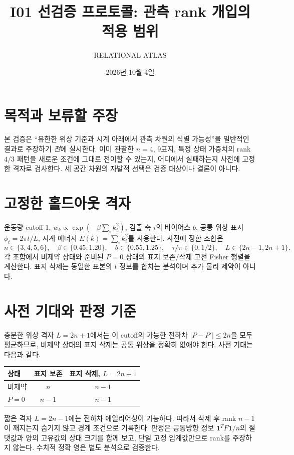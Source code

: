 \documentclass[11pt,a4paper]{article}
\title{I01 선검증 프로토콜: 관측 rank 개입의 적용 범위}
\author{RELATIONAL ATLAS}
\date{2026년 10월 4일}
\begin{document}
\maketitle

\section{목적과 보류할 주장}
본 검증은 ``유한한 위상 기준과 시계 아래에서 관측 차원의 식별
가능성''을 일반적인 결과로 주장하기 \emph{전}에 실시한다.
이미 관찰한 $n=4$, 9표지, 특정 상태 가중치의 rank $4/3$
패턴을 새로운 조건에 그대로 전이할 수 있는지, 어디에서 실패하는지
사전에 고정한 격자로 검사한다. 세 공간 차원의 자발적 선택은
검증 대상이나 결론이 아니다.

\section{고정한 홀드아웃 격자}
운동량 cutoff 1, $w_k\propto\exp(-\beta\sum_i k_i^2)$,
검출 축 $i$의 바이어스 $b$, 공통 위상 표지
$\phi_t=2\pi t/L$, 시계 에너지 $E(k)=\sum_i k_i^2$를 사용한다.
사전에 정한 조합은
\begin{equation}
 n\in\{3,4,5,6\},\quad
 \beta\in\{0.45,1.20\},\quad
 b\in\{0.55,1.25\},\quad
 \tau/\pi\in\{0,1/2\},\quad
 L\in\{2n-1,2n+1\}.
\end{equation}
각 조합에서 비제약 상태와 준비된 $P=0$ 상태의 표지 보존/삭제
고전 Fisher 행렬을 계산한다. 표지 삭제는 동일한 표본의
$t$ 정보를 합치는 분석이며 추가 물리 제약이 아니다.

\section{사전 기대와 판정 기준}
충분한 위상 격자 $L=2n+1$에서는 이 cutoff의 가능한 전하차
$|P-P'|\le2n$을 모두 평균하므로, 비제약 상태의 표지 삭제는
공통 위상을 정확히 없애야 한다. 사전 기대는 다음과 같다.
\begin{center}
\begin{tabular}{@{}lcc@{}}
\toprule
상태 & 표지 보존 & 표지 삭제, $L=2n+1$ \\
\midrule
비제약 & $n$ & $n-1$ \\
$P=0$ & $n-1$ & $n-1$ \\
\bottomrule
\end{tabular}
\end{center}
짧은 격자 $L=2n-1$에는 전하차 에일리어싱이 가능하다.
따라서 삭제 후 rank $n-1$이 깨지는지 숨기지 않고 경계 조건으로
기록한다. 판정은 공통방향 정보
$\boldsymbol1^T F\boldsymbol1/n$의 절댓값과 양의 고유값의
상대 크기를 함께 보고, 단일 고정 임계값만으로 rank를 주장하지
않는다. 수치적 정확 영은 별도 분석으로 검증한다.
\end{document}
